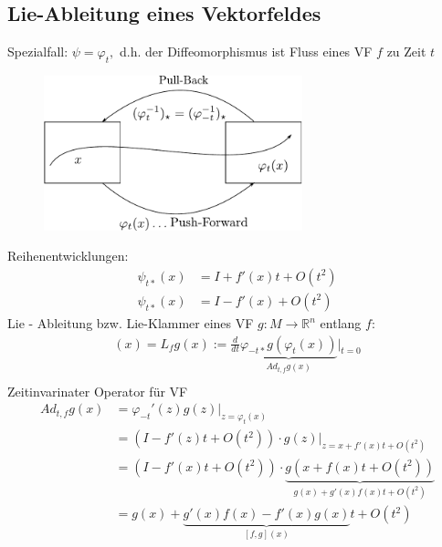 \documentclass[ngerman]{tudscrreprt}
\begin{document}
\subsection{Lie-Ableitung eines Vektorfeldes}
Spezialfall: $\psi = \varphi_t,$ d.h. der Diffeomorphismus ist Fluss eines VF $f$ zu Zeit $t$ 
\begin{figure}[H]
\centering
\def\svgwidth{200pt} 
  \includegraphics[width=7.5cm]{images/im3122.pdf}
\end{figure}
Reihenentwicklungen:
\begin{align*}
\psi_{t*}(x) &= I + f'(x)t + O(t^2)\\ 
\psi_{t*}(x) &= I- f'(x) + O(t^2)
\end{align*}
Lie - Ableitung bzw. Lie-Klammer eines VF $g: M\to \mathbb{R}^n$ entlang $f:$
\begin{align*}
[ f,g](x) = L_fg(x) := \frac{d}{dt}\underbrace{\varphi_{-t*}g(\varphi_t(x))}_{Ad_{t,f}g(x)}|_{t=0}\\ 
\end{align*}
Zeitinvarinater Operator für VF\\ 
\begin{align*}
Ad_{t,f}g(x)&=\varphi_{-t}'(z) g(z)|_{z=\varphi_t(x)}\\ 
&=(I - f'(z)t+ O(t^2))\cdot g(z)|_{z= x+ f'(x)t+ O(t^2)}\\ 
&=(I - f'(x)t+ O(t^2))\cdot \underbrace{g(x+ f(x)t + O(t^2) ) }_{g(x) + g'(x)f(x)t+ O(t^2) }\\ 
&=g(x) + \underbrace{g'(x)f(x) - f'(x)g(x) }_{[f,g](x)}t + O(t^2)
\end{align*}
\end{document}
